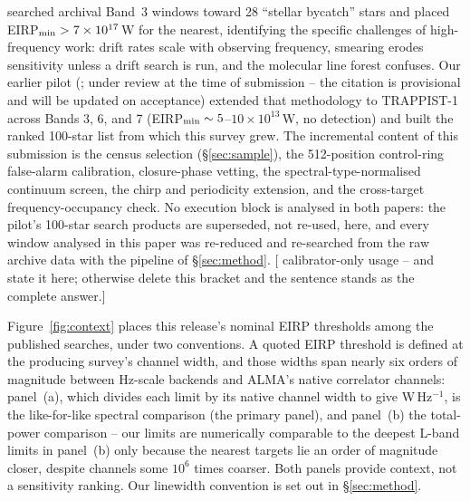\documentclass{openjournal}
\begin{document}
\citet{Mason2024} searched archival Band~3 windows toward 28
``stellar bycatch'' stars and placed EIRP$_{\rm min} >
7\times10^{17}$\,W for the nearest, identifying the specific
challenges of high-frequency work: drift rates scale with observing
frequency, smearing erodes sensitivity unless a drift search is run,
and the molecular line forest confuses. Our earlier pilot
(\citealp{White2026}; under review at the time of submission -- the
citation is provisional and will be updated on acceptance) extended
that methodology to TRAPPIST-1 across Bands 3, 6, and 7
(EIRP$_{\rm min}\sim5$--$10\times10^{13}$\,W, no detection) and built
the ranked 100-star list from which this survey grew. The incremental
content of this submission is the census selection
(\S\ref{sec:sample}), the 512-position control-ring
false-alarm calibration, closure-phase vetting, the
spectral-type-normalised continuum screen, the chirp and periodicity
extension, and the cross-target frequency-occupancy check.
No execution block is analysed in both papers: the pilot's 100-star
search products are superseded, not re-used, here, and every window
analysed in this paper was re-reduced and re-searched from the raw
archive data with the pipeline of \S\ref{sec:method}.
[%
calibrator-only usage -- and state it here; otherwise delete this
bracket and the sentence stands as the complete answer.]

Figure~\ref{fig:context} places this release's nominal EIRP thresholds
among the published searches, under two conventions. A quoted EIRP
threshold is defined at the producing survey's channel width, and
those widths span nearly six orders of magnitude between Hz-scale
backends and ALMA's native correlator channels: panel~(a), which
divides each limit by its native channel width to give
W\,Hz$^{-1}$, is the like-for-like spectral comparison (the primary
panel), and panel~(b) the total-power comparison -- our limits are
numerically comparable to the deepest L-band limits in panel~(b)
only because the nearest targets lie an order of magnitude closer,
despite channels some $10^{6}$ times coarser. Both panels provide
context, not a sensitivity ranking. Our linewidth convention is set
out in \S\ref{sec:method}.
\end{document}
